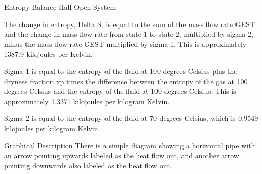 Entropy Balance Half-Open System

The change in entropy, Delta S, is equal to the sum of the mass flow rate GEST and the change in mass flow rate from state 1 to state 2, multiplied by sigma 2, minus the mass flow rate GEST multiplied by sigma 1. This is approximately 1387.9 kilojoules per Kelvin.

Sigma 1 is equal to the entropy of the fluid at 100 degrees Celsius plus the dryness fraction xp times the difference between the entropy of the gas at 100 degrees Celsius and the entropy of the fluid at 100 degrees Celsius. This is approximately 1.3371 kilojoules per kilogram Kelvin.

Sigma 2 is equal to the entropy of the fluid at 70 degrees Celsius, which is 0.9549 kilojoules per kilogram Kelvin.

Graphical Description
There is a simple diagram showing a horizontal pipe with an arrow pointing upwards labeled as the heat flow out, and another arrow pointing downwards also labeled as the heat flow out.